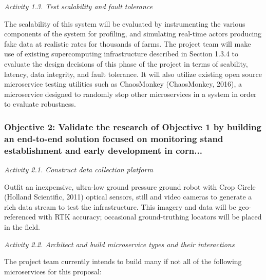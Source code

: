 \documentclass[11pt]{article}
\begin{document}
\noindent
{\em Activity 1.3. Test scalability and fault tolerance}

The scalability of this system will be evaluated by instrumenting the various components of the system for profiling, 
and simulating real-time actors producing fake data at realistic rates for thousands of farms.  The project team will 
make use of existing supercomputing infrastructure described in Section 1.3.4 to evaluate the design decisions of this 
phase of the project in terms of scability, latency, data integrity, and fault tolerance.  It will also utilize existing open source 
microservice testing utilities such as ChaosMonkey (ChaosMonkey, 2016), a microservice designed to randomly stop 
other microservices in a system in order to evaluate robustness.

\subsubsection{Objective 2: Validate the research of Objective 1 by building an end-to-end solution focused on 
	monitoring stand establishment and early development in corn...}

\noindent
{\em Activity 2.1. Construct data collection platform}

Outfit an inexpensive, ultra-low ground pressure ground robot with Crop Circle (Holland Scientific, 2011) 
optical sensors, still and video cameras to generate a rich data stream to test the infrastructure. This imagery 
and data will be geo-referenced with RTK accuracy; occasional ground-truthing locators will be placed in the field.

\noindent
{\em Activity 2.2.  Architect and build microservice types and their interactions}

The project team currently intends to build many if not all of the following microservices for this proposal:
\end{document}

